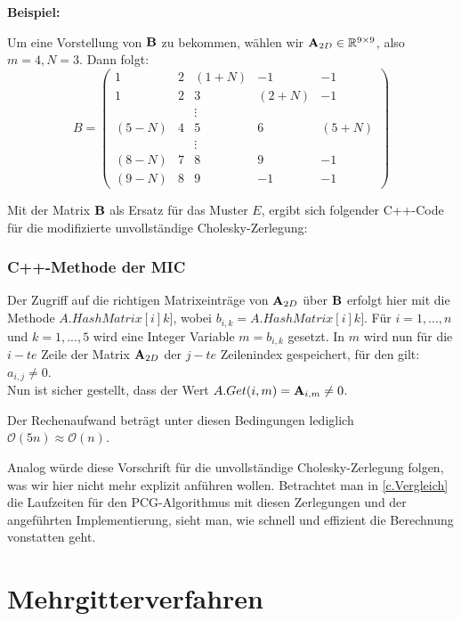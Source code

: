 \textbf{Beispiel:}

Um eine Vorstellung von ${\textbf{B}}$ zu bekommen, wählen wir ${\textbf{A}}_{2D} \in \mathbb{R}^{9 \times 9}$, also $m = 4, N = 3$. Dann folgt:
\begin{equation}
B = 
\begin{pmatrix}
1 & 2 & (1+N) & -1 & -1\\
1 & 2 & 3 & (2+N) & -1\\
  &   & \vdots & &\\
(5-N) & 4 & 5 & 6 & (5+N)\\
  &   & \vdots & &\\
(8-N) & 7 & 8 & 9 & -1\\
(9-N) & 8 & 9 & -1 & -1
\end{pmatrix}
\end{equation}

Mit der Matrix ${\textbf{B}}$ als Ersatz für das Muster $E$, ergibt sich folgender C++-Code für die modifizierte unvollständige Cholesky-Zerlegung:

\subsection{C++-Methode der MIC}\label{s.MIC}

Der Zugriff auf die richtigen Matrixeinträge von ${\textbf{A}}_{2D}$ über ${\textbf{B}}$ erfolgt hier mit die Methode $A.HashMatrix[i]k]$, wobei $b_{i,k} = A.HashMatrix[i]k]$. Für $i = 1,...,n$ und $k = 1,...,5$ wird eine Integer Variable $m = b_{i,k}$ gesetzt. In $m$ wird nun für die $i - te$ Zeile der Matrix ${\textbf{A}}_{2D}$ der $j - te$ Zeilenindex gespeichert, für den gilt: $a_{i,j} \ne 0$.\\
Nun ist sicher gestellt, dass der Wert $A.Get(i,m) = {\textbf{A}}_{i,m} \ne 0$.

Der Rechenaufwand beträgt unter diesen Bedingungen lediglich $\mathcal{O}(5n) \approx \mathcal{O}(n)$.

Analog würde diese Vorschrift für die unvollständige Cholesky-Zerlegung folgen, was wir hier nicht mehr explizit anführen wollen. Betrachtet man in \autoref{c.Vergleich} die Laufzeiten für den PCG-Algorithmus mit diesen Zerlegungen und der angeführten Implementierung, sieht man, wie schnell und effizient die Berechnung vonstatten geht.

\chapter{Mehrgitterverfahren}\label{c.Mehrgitterverfahren}

